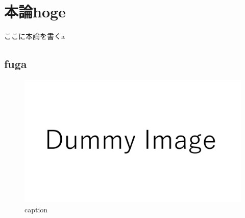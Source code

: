 \documentclass[main]{subfiles}
\begin{document}
\chapter{本論hoge}
ここに本論を書くa\cite{ref:yao2017integrated}\cite{ref:ugarte1992curling} \cite{ref:nomura2022uwb} \cite{key}
\section{fuga}

\begin{figure}[htbp]
    \centering
    \includegraphics[keepaspectratio, width=\linewidth]{figures/dummy.pdf}
    \caption{caption}
    \label{fig:label}
\end{figure}
\end{document}
